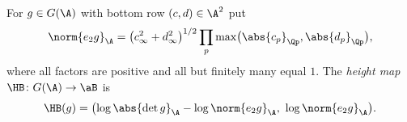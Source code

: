 For $g\in G(\A)$ with bottom row $(c,d)\in\A^2$ put
\[
  \norm{e_2g}_\A=\bigl(c_\infty^2+d_\infty^2\bigr)^{1/2}\prod_p\max\bigl(\abs{c_p}_{\Qp},\abs{d_p}_{\Qp}\bigr),
\]
where all factors are positive and all but finitely many equal $1$. The \emph{height map} $\HB\colon G(\A)\to\aB$ is
\[
  \HB(g)=\bigl(\log\abs{\det g}_\A-\log\norm{e_2g}_\A,\ \log\norm{e_2g}_\A\bigr).
\]
